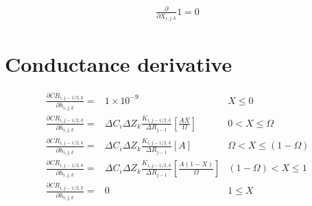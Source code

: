 \documentclass[11pt]{article} %
\begin{document}
\begin{align}
	\frac{\partial}{\partial X_{i,j,k}} 1 = 0
	\label{eq:deriv5}
\end{align}


\section{Conductance derivative}

\begin{subequations}
\begin{align}
	\frac{\partial CR_{i,j-1/2,k}}{\partial h_{i,j,k}} = & 1 \times 10^{-9} & X \leq 0 \\
	\frac{\partial CR_{i,j-1/2,k}}{\partial h_{i,j,k}} = & \Delta C_{i} \Delta Z_{k} \frac{K_{i,j-1/2,k}}{\Delta R_{j-1}} \left[ \frac{AX}{\Omega} \right]  & 0 < X \leq \Omega \\
	\frac{\partial CR_{i,j-1/2,k}}{\partial h_{i,j,k}} = & \Delta C_{i} \Delta Z_{k} \frac{K_{i,j-1/2,k}}{\Delta R_{j-1}} \left[ A \right] & \Omega < X \leq (1 - \Omega ) \\
	\frac{\partial CR_{i,j-1/2,k}}{\partial h_{i,j,k}} = & \Delta C_{i} \Delta Z_{k} \frac{K_{i,j-1/2,k}}{\Delta R_{j-1}} \left[ \frac{A \left(1 - X \right)}{\Omega} \right]  & (1 - \Omega) < X \leq 1 \\
	\frac{\partial CR_{i,j-1/2,k}}{\partial h_{i,j,k}} = & 0 & 1 \leq X
	\label{eq:anald}
\end{align}
\end{subequations}
\end{document}

